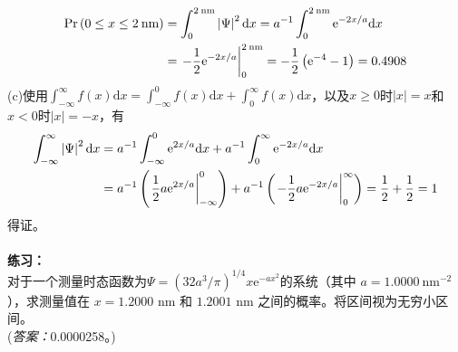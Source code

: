 	\begin{equation*}
		\begin{aligned}
			\text{Pr} \left(0 \le x \le 2 \: \text{nm}\right) & = \int_{0}^{2 \: \text{nm}}\left|\Psi\right|^2 \mathrm{d}x  = a^{-1} \int_{0}^{2 \: \text{nm}} \mathrm{e}^{-2x/a}\mathrm{d}x\\
			& = \eval{-\frac{1}{2}\mathrm{e}^{-2x/a}}_{0}^{2 \: \text{nm}} = -\frac{1}{2}\left(\mathrm{e}^{-4}-1\right) = 0.4908
		\end{aligned}
	\end{equation*}
	(c)使用$\int_{-\infty}^{\infty} f\left(x\right) \mathrm{d}x = \int_{-\infty}^{0} f \left(x\right) \mathrm{d}x+\int_{0}^{\infty} f\left(x\right) \mathrm{d}x$，以及$x \ge 0$时$\left|x\right| = x$和$x < 0$时$\left|x\right| = -x$，有
	\begin{equation*}
		\begin{aligned}
			\int_{-\infty}^{\infty} \left|\Psi\right|^2 \mathrm{d}x  & = a ^{-1}\int_{-\infty}^{0} \mathrm{e}^{2x/a}\mathrm{d}x + a^{-1}\int_{0}^{\infty} \mathrm{e}^{-2x/a}\mathrm{d}x\\
			& = a^{-1}\left(\eval{\frac{1}{2}a\mathrm{e}^{2x/a}}_{-\infty}^{0}\right) + a^{-1}\left(\eval{-\frac{1}{2}a\mathrm{e}^{-2x/a}}_{0}^{\infty}\right) = \frac{1}{2} + \frac{1}{2} = 1 
		\end{aligned}
	\end{equation*}
	得证。\\
	\\
	
	 \noindent \textbf{练习：}\\
	对于一个测量时态函数为$\Psi = \left(32 a^3 /\pi \right)^{1/4} x \mathrm{e}^{-ax^2}$的系统（其中 $a = 1.0000 \: \text{nm}^{-2}$），求测量值在 $x = 1.2000$ nm 和 $1.2001$ nm 之间的概率。将区间视为无穷小区间。\\
	(\textit{答案：}0.0000258。)
	

